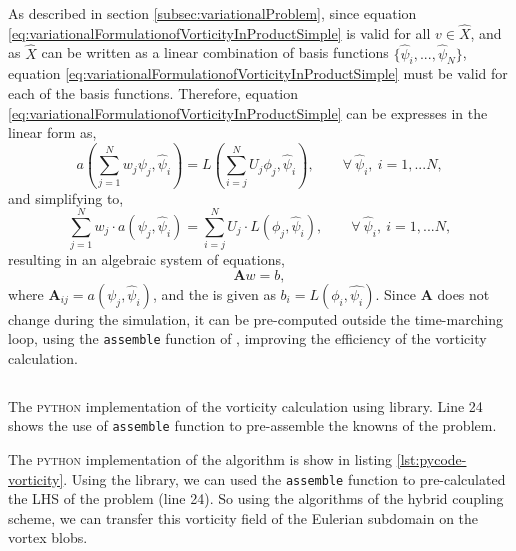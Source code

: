 As described in section \ref{subsec:variationalProblem}, since equation \ref{eq:variationalFormulationofVorticityInProductSimple} is valid for all $v \in \hat{X}$, and as $\hat{X}$ can be written as a linear combination of basis functions $\{\hat{\psi}_i,...,\hat{\psi}_N\}$, equation \ref{eq:variationalFormulationofVorticityInProductSimple} must be valid for each of the basis functions.  Therefore, equation \ref{eq:variationalFormulationofVorticityInProductSimple} can be expresses in the linear form as, 
		\begin{equation}
		a(\sum_{j=1}^N w_j\psi_j,\hat{\psi}_i) = L(\sum_{i=j}^N U_j \phi_j,\hat{\psi}_i), \qquad \forall\ \hat{\psi}_i,\ i=1,...N,
		\label{eq:variationalFormulationofVorticityInProductSimpleLinear}
		\end{equation}
and simplifying to,
		\begin{equation}
		\sum_{j=1}^N w_j\cdot{a}(\psi_j,\hat{\psi}_i) = \sum_{i=j}^N U_j\cdot{L}(\phi_j,\hat{\psi}_i), \qquad \forall\ \hat{\psi}_i,\ i=1,...N,
		\label{eq:variationalFormulationofVorticityInProductSimpleLinearSum}
		\end{equation}
resulting in an algebraic system of equations,
		\begin{equation}
		\mathbf{A}w = b,
		\label{eq:variationalFormulationofVorticityInProductSimpleLinearSumSoE}
		\end{equation}
where $\mathbf{A}_{ij} = a(\psi_j, \hat{\psi}_i)$, and the  is given as $b_i = L(\phi_i, \hat{\psi_i})$. Since $\mathbf{A}$ does not change during the simulation, it can be pre-computed outside the time-marching loop, using the \texttt{assemble} function of \dolfin, improving the efficiency of the vorticity calculation.

	\begin{listing}[!t]
	\inputminted[fontseries=courier,obeytabs,fontsize=\footnotesize,mathescape,linenos,numbersep=5pt,frame=lines,framesep=2mm,xleftmargin=20mm,xrightmargin=20mm]{python}{figures/eulerian/vorticity.py}
	\caption{The \textsc{python} implementation of the vorticity calculation using  library. Line 24 shows the use of \texttt{assemble} function to pre-assemble the knowns of the problem.}
	\label{lst:pycode-vorticity}
	\end{listing}

The \textsc{python} implementation of the algorithm is show in listing \ref{lst:pycode-vorticity}. Using the \dolfin library, we can used the \texttt{assemble} function to pre-calculated the LHS of the problem (line 24). So using the algorithms of the hybrid coupling scheme, we can transfer this vorticity field of the Eulerian subdomain on the vortex blobs.

